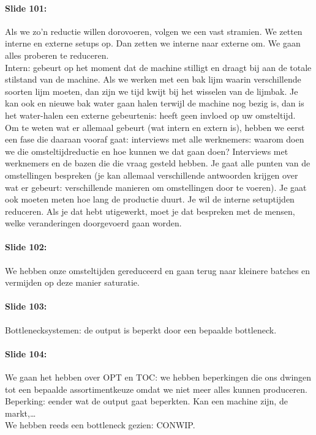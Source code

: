 \documentclass[10pt,a4paper]{report}
\begin{document}
\paragraph{Slide 101:} Als we zo'n reductie willen dorovoeren, volgen we een vast stramien. We zetten interne en externe setups op. Dan zetten we interne naar externe om.
We gaan alles proberen te reduceren. \\
Intern: gebeurt op het moment dat de machine stilligt en draagt bij aan de totale stilstand van de machine. Als we werken met een bak lijm waarin verschillende soorten lijm moeten, dan zijn we tijd kwijt bij het wisselen van de lijmbak. Je kan ook en nieuwe bak water gaan halen terwijl de machine nog bezig is, dan is het water-halen een externe gebeurtenis: heeft geen invloed op uw omsteltijd. \\
Om te weten wat er allemaal gebeurt (wat intern en extern is), hebben we eerst een fase die daaraan vooraf gaat: interviews met alle werknemers: waarom doen we die omsteltijdreductie en hoe kunnen we dat gaan doen? Interviews met werknemers en de bazen die die vraag gesteld hebben. Je gaat alle punten van de omstellingen bespreken (je kan allemaal verschillende antwoorden krijgen over wat er gebeurt: verschillende manieren om omstellingen door te voeren). Je gaat ook moeten meten hoe lang de productie duurt. Je wil de interne setuptijden reduceren. Als je dat hebt utigewerkt, moet je dat bespreken met de mensen, welke veranderingen doorgevoerd gaan worden. 

\paragraph{Slide 102:} We hebben onze omsteltijden gereduceerd en gaan terug naar kleinere batches en vermijden op deze manier saturatie.

\paragraph{Slide 103:} Bottlenecksystemen: de output is beperkt door een bepaalde bottleneck. 

\paragraph{Slide 104:} We gaan het hebben over OPT en TOC: we hebben beperkingen die ons dwingen tot een bepaalde assortimentkeuze omdat we niet meer alles kunnen produceren.\\
Beperking: eender wat de output gaat beperkten. Kan een machine zijn, de markt,…\\
We hebben reeds een bottleneck gezien: CONWIP.
\end{document}
